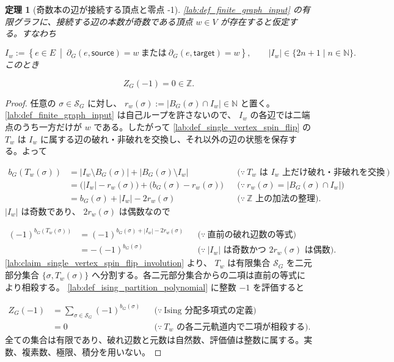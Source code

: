 \documentclass[11pt,a4paper]{article}
\newtheorem{theorem}[definition]{定理}
\theoremstyle{remark}
\begin{document}
\begin{theorem}[奇数本の辺が接続する頂点と零点 -1]\label{lab:theorem_odd_incident_edge_count_root_minus_one}
\cref{lab:def_finite_graph_input}
 の有限グラフに、接続する辺の本数が奇数である頂点 
$w\in V$
 が存在すると仮定する。すなわち

\[I_w:=\left\{e\in E\ \middle|\ \partial_G(e,\mathsf{source})=w\ \text{または}\ \partial_G(e,\mathsf{target})=w\right\},\qquad |I_w|\in\{2n+1\mid n\in\mathbb N\}.\]
このとき

\[Z_G(-1)=0\in\mathbb Z.\]
\end{theorem}
\begin{proof}
任意の 
$\sigma\in\mathcal S_G$
 に対し、
$r_w(\sigma):=|B_G(\sigma)\cap I_w|\in\mathbb N$
 と置く。
\cref{lab:def_finite_graph_input}
 は自己ループを許さないので、
$I_w$
 の各辺では二端点のうち一方だけが 
$w$
 である。したがって 
\cref{lab:def_single_vertex_spin_flip}
 の 
$T_w$
 は 
$I_w$
 に属する辺の破れ・非破れを交換し、それ以外の辺の状態を保存する。よって

\[\begin{aligned}
b_G(T_w(\sigma))
&=|I_w\setminus B_G(\sigma)|+|B_G(\sigma)\setminus I_w|
&&\bigl(\because\ T_w\text{ は }I_w\text{ 上だけ破れ・非破れを交換する}\bigr)\\
&=\bigl(|I_w|-r_w(\sigma)\bigr)+\bigl(b_G(\sigma)-r_w(\sigma)\bigr)
&&\bigl(\because\ r_w(\sigma)=|B_G(\sigma)\cap I_w|\bigr)\\
&=b_G(\sigma)+|I_w|-2r_w(\sigma)
&&\bigl(\because\ \mathbb Z\text{ 上の加法の整理}\bigr).
\end{aligned}\]
$|I_w|$
 は奇数であり、
$2r_w(\sigma)$
 は偶数なので

\[\begin{aligned}
(-1)^{b_G(T_w(\sigma))}
&=(-1)^{b_G(\sigma)+|I_w|-2r_w(\sigma)}
&&\bigl(\because\ \text{直前の破れ辺数の等式}\bigr)\\
&=-(-1)^{b_G(\sigma)}
&&\bigl(\because\ |I_w|\text{ は奇数かつ }2r_w(\sigma)\text{ は偶数}\bigr).
\end{aligned}\]
\cref{lab:claim_single_vertex_spin_flip_involution}
 より、
$T_w$
 は有限集合 
$\mathcal S_G$
 を二元部分集合 
$\{\sigma,T_w(\sigma)\}$
 へ分割する。各二元部分集合からの二項は直前の等式により相殺する。
\cref{lab:def_ising_partition_polynomial}
 に整数 
$-1$
 を評価すると

\[\begin{aligned}
Z_G(-1)
&=\sum_{\sigma\in\mathcal S_G}(-1)^{b_G(\sigma)}
&&\bigl(\because\ \text{Ising 分配多項式の定義}\bigr)\\
&=0
&&\bigl(\because\ T_w\text{ の各二元軌道内で二項が相殺する}\bigr).
\end{aligned}\]
全ての集合は有限であり、破れ辺数と元数は自然数、評価値は整数に属する。実数、複素数、極限、積分を用いない。

\end{proof}
\end{document}
